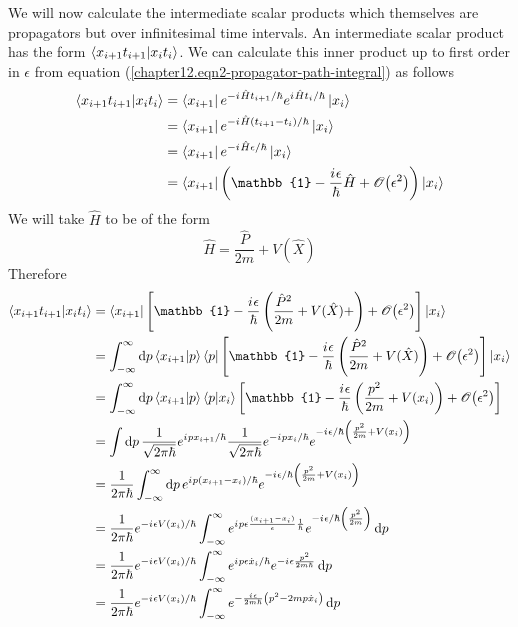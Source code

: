 	
	We will now calculate the intermediate scalar products which themselves are propagators but over infinitesimal time intervals. An intermediate scalar product has the form $\braket{x_{i+1} t_{i+1}}{x_i t_i}$. We can calculate this inner product up to first order in $\epsilon$ from equation (\ref{chapter12.eqn2-propagator-path-integral}) as follows
	\begin{align}
		\braket{x_{i+1} t_{i+1}}{x_i t_i} &= \bra{x_{i+1}} e^{-\iu \hat{H}t_{i+1}/\hbar}e^{\iu \hat{H}t_{i}/\hbar}\ket{x_i}\\
		&= \bra{x_{i+1}} e^{-\iu \hat{H}(t_{i+1} - t_i)/\hbar}\ket{x_i}\\
		&= \bra{x_{i+1}} e^{-\iu \hat{H}\epsilon/\hbar}\ket{x_i}\\
		&= \bra{x_{i+1}} \left(\mathbb{1} - \frac{\iu \epsilon}{\hbar}\hat{H} + \order{\epsilon^2}\right)\ket{x_i}
	\end{align}
	We will take $\hat{H}$ to be of the form
	\begin{equation}
		\hat{H} = \frac{\hat{P}}{2 m} + V(\hat{X})
	\end{equation}
	Therefore
	\begin{align}
		\braket{x_{i+1} t_{i+1}}{x_i t_i} 
		&= \bra{x_{i+1}}\left[\mathbb{1} - \frac{\iu \epsilon}{\hbar}\left(\frac{\hat{P}^2}{2 m} + V(\hat{X}) + \right) + \order{\epsilon^2}\right]\ket{x_i}\\
		&= \int_{-\infty}^{\infty} \dd{p} \braket{x_{i+1}}{p} \bra{p} \left[\mathbb{1} - \frac{\iu \epsilon}{\hbar}\left(\frac{\hat{P}^2}{2 m} + V(\hat{X})\right) + \order{\epsilon^2}\right] \ket{x_i} \\
		&= \int_{-\infty}^{\infty} \dd{p} \braket{x_{i+1}}{p} \braket{p}{x_i} \left[\mathbb{1} - \frac{\iu \epsilon}{\hbar}\left(\frac{p^2}{2 m} + V(x_i)\right) + \order{\epsilon^2}\right]  \\
		&= \int \dd{p} \frac{1}{\sqrt{2\pi \hbar}}e^{\iu p x_{i+1}/\hbar}\frac{1}{\sqrt{2\pi \hbar}}e^{-\iu p x_{i}/\hbar} e^{-\iu \epsilon/\hbar \left( \frac{p^2}{2 m} + V(x_i) \right)} \\
		&= \frac{1}{2\pi\hbar} \int_{-\infty}^{\infty} \dd{p} e^{\iu p (x_{i+1} - x_i)/\hbar} e^{-\iu \epsilon/\hbar \left( \frac{p^2}{2 m} + V(x_i) \right)} \\
		&= \frac{1}{2\pi\hbar} e^{-\iu \epsilon V(x_i)/\hbar} \int_{-\infty}^{\infty} e^{\iu p \epsilon\frac{(x_{i+1} - x_i)}{\epsilon}\frac{1}{\hbar}} e^{-\iu \epsilon/\hbar \left( \frac{p^2}{2 m}\right)} \dd{p}\\
		&= \frac{1}{2\pi\hbar} e^{-\iu \epsilon V(x_i)/\hbar} \int_{-\infty}^{\infty} e^{\iu p \epsilon \dot{x}_i / \hbar} e^{-\iu \epsilon \frac{p^2}{2 m \hbar}} \dd{p} \\
		&= \frac{1}{2\pi\hbar} e^{-\iu \epsilon V(x_i)/\hbar} \int_{-\infty}^{\infty} e^{-\frac{\iu \epsilon}{2 m \hbar} \left(p^2 - 2 m p \dot{x}_i \right)} \dd{p}
		\label{chapter12.eqn6-path-integral-propagator}
	\end{align}
